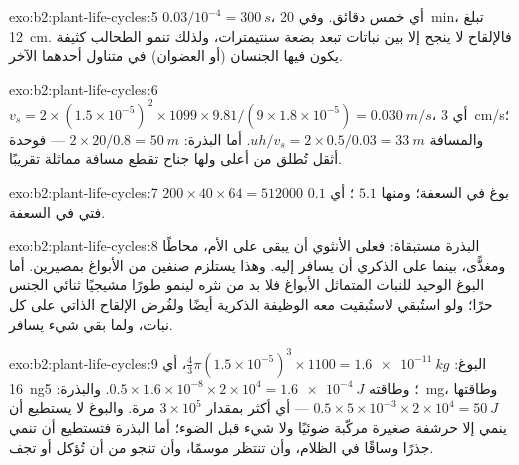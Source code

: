 \begin{solution}{exo:b2:plant-life-cycles:5}
$0.03/10^{-4} = \qty{300}{s}$، أي خمس دقائق. وفي \qty{20}{min}،
تبلغ \qty{12}{cm}. فالإلقاح لا ينجح إلا بين نباتات تبعد بضعة
سنتيمترات، ولذلك تنمو الطحالب  كثيفة يكون فيها الجنسان (أو
العضوان) في متناول أحدهما الآخر.
\end{solution}

\begin{solution}{exo:b2:plant-life-cycles:6}
$v_s = 2\times(1.5\times 10^{-5})^2\times 1099\times 9.81/(9\times
1.8\times 10^{-5}) = \qty{0.030}{m/s}$، أي \qty{3}{cm/s}؛ والمسافة $uh/v_s
= 2\times 0.5/0.03 = \qty{33}{m}$. أما البذرة: $2\times 20/0.8 =
\qty{50}{m}$ --- فوحدة أثقل تُطلق من أعلى ولها جناح تقطع مسافة
مماثلة تقريبًا.
\end{solution}

\begin{solution}{exo:b2:plant-life-cycles:7}
$200\times 40\times 64 = \num{512000}$ بوغ في السعفة؛ ومنها $5.1$
؛ أي $0.1$  فتي في السعفة.
\end{solution}

\begin{solution}{exo:b2:plant-life-cycles:8}
البذرة  مستبقاة: فعلى  الأنثوي أن يبقى على الأم،
محاطًا ومغذًّى، بينما على  الذكري أن يسافر إليه. وهذا
يستلزم صنفين من الأبواغ بمصيرين. أما البوغ الوحيد للنبات المتماثل
الأبواغ فلا بد من نثره لينمو طورًا مشيجيًا ثنائي الجنس حرًا؛ ولو
استُبقي لاستُبقيت معه الوظيفة الذكرية أيضًا ولفُرض الإلقاح الذاتي
على كل نبات، ولما بقي شيء يسافر.
\end{solution}

\begin{solution}{exo:b2:plant-life-cycles:9}
البوغ: $\tfrac43\pi(1.5\times 10^{-5})^3\times 1100 =
\qty{1.6e-11}{kg}$، أي \qty{16}{ng}؛ وطاقته $0.5\times 1.6\times
10^{-8}\times 2\times 10^{4} = \qty{1.6e-4}{J}$. والبذرة: \qty{5}{mg}،
وطاقتها $0.5\times 5\times 10^{-3}\times 2\times 10^{4} = \qty{50}{J}$ ---
أي أكثر بمقدار $3\times 10^{5}$ مرة. والبوغ لا يستطيع أن ينمي إلا حرشفة
صغيرة مركّبة ضوئيًا ولا شيء قبل الضوء؛ أما البذرة فتستطيع أن تنمي
جذرًا وساقًا في الظلام، وأن تنتظر موسمًا، وأن تنجو من أن تُؤكل أو
تجف.
\end{solution}

